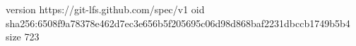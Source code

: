version https://git-lfs.github.com/spec/v1
oid sha256:6508f9a78378e462d7ec3e656b5f205695c06d98d868baf2231dbccb1749b5b4
size 723
